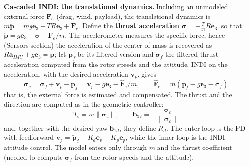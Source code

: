 \documentclass[10pt, a4paper]{report}
\begin{document}
\noindent\textbf{Cascaded INDI: the translational dynamics.} Including an unmodeled external force $\mathbf F_e$ (drag, wind, payload), the translational dynamics is $m\ddot{\mathbf p}=mg\mathbf e_3-TR\mathbf e_3+\mathbf F_e$. Define the \textbf{thrust acceleration} $\boldsymbol{\sigma}=-\frac{T}{m}R\mathbf e_3$, so that $\ddot{\mathbf p}=g\mathbf e_3+\boldsymbol{\sigma}+\mathbf F_e/m$. The accelerometer measures the specific force, hence (Sensors section) the acceleration of the center of mass is recovered as $R\mathbf a_{IMU}+g\mathbf e_3=\ddot{\mathbf p}$; let $\ddot{\mathbf p}_f$ be its filtered version and $\boldsymbol{\sigma}_f$ the filtered thrust acceleration computed from the rotor speeds and the attitude. INDI on the acceleration, with the desired acceleration $\mathbf v_p$, gives
\begin{equation}
    \boldsymbol{\sigma}_c=\boldsymbol{\sigma}_f+\mathbf v_p-\ddot{\mathbf p}_f=\mathbf v_p-g\mathbf e_3-\hat{\mathbf F}_e/m,\qquad\hat{\mathbf F}_e=m(\ddot{\mathbf p}_f-g\mathbf e_3-\boldsymbol{\sigma}_f)
\end{equation}
that is, the external force is estimated and compensated. The thrust and the direction are computed as in the geometric controller:\begin{equation}
    T_c=m\|\boldsymbol{\sigma}_c\|,\qquad\mathbf b_{3d}=-\frac{\boldsymbol{\sigma}_c}{\|\boldsymbol{\sigma}_c\|}
\end{equation}
and, together with the desired yaw $\mathbf b_{1d}$, they define $R_d$. The outer loop is the PD with feedforward $\mathbf v_p=\ddot{\mathbf p}_d-K_d\mathbf e_v-K_p\mathbf e_p$, while the inner loop is the INDI attitude control. The model enters only through $m$ and the thrust coefficient (needed to compute $\boldsymbol{\sigma}_f$ from the rotor speeds and the attitude).\bigskip
\end{document}
